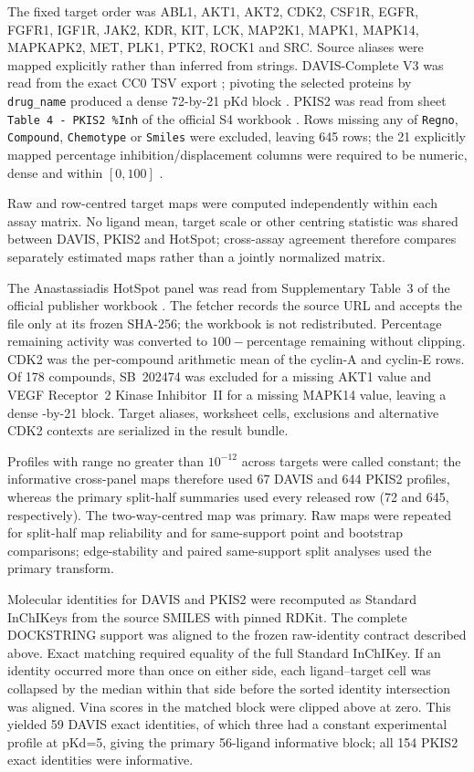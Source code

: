 The fixed target order was ABL1, AKT1, AKT2, CDK2, CSF1R, EGFR, FGFR1, IGF1R,
JAK2, KDR, KIT, LCK, MAP2K1, MAPK1, MAPK14, MAPKAPK2, MET, PLK1, PTK2, ROCK1
and SRC.  Source aliases were mapped explicitly rather than inferred from
strings.  DAVIS-Complete V3 was read from the exact CC0 TSV export
; pivoting the selected proteins by
\texttt{drug\_name} produced a dense 72-by-21 pKd block \cite{davis2011,wu2025davis}.
PKIS2 was read from sheet \texttt{Table 4 - PKIS2 \%Inh} of the official S4
workbook .  Rows missing any of \texttt{Regno},
\texttt{Compound}, \texttt{Chemotype} or \texttt{Smiles} were excluded, leaving
645 rows; the 21 explicitly mapped percentage inhibition/displacement columns
were required to be numeric, dense and within $[0,100]$ \cite{drewry2017}.

Raw and row-centred target maps were computed independently within each assay
matrix. No ligand mean, target scale or other centring statistic was shared
between DAVIS, PKIS2 and HotSpot; cross-assay agreement therefore compares
separately estimated maps rather than a jointly normalized matrix.

The Anastassiadis HotSpot panel was read from Supplementary Table~3 of the
official publisher workbook \cite{anastassiadis2011}. The fetcher records the
source URL and accepts the file only at its frozen SHA-256; the workbook is not
redistributed. Percentage remaining activity was converted to
$100-\text{percentage remaining}$ without clipping. CDK2 was the per-compound
arithmetic mean of the cyclin-A and cyclin-E rows. Of 178 compounds, SB~202474
was excluded for a missing AKT1 value and VEGF Receptor~2 Kinase Inhibitor~II
for a missing MAPK14 value, leaving a dense \HotspotLigands{}-by-21 block.
Target aliases, worksheet cells, exclusions and alternative CDK2 contexts are
serialized in the result bundle.

Profiles with range no greater than $10^{-12}$ across targets were called
constant; the informative cross-panel maps therefore used 67 DAVIS and 644
PKIS2 profiles, whereas the primary split-half summaries used every released
row (72 and 645, respectively).  The two-way-centred map was primary.  Raw maps
were repeated for split-half map reliability and for same-support point and
bootstrap comparisons; edge-stability and paired same-support split analyses
used the primary transform.

Molecular identities for DAVIS and PKIS2 were recomputed as Standard InChIKeys
from the source SMILES with pinned RDKit.  The complete DOCKSTRING support was
aligned to the frozen raw-identity contract described above.  Exact matching
required equality of the full Standard InChIKey.  If an identity occurred more
than once on either side, each ligand--target cell was collapsed by the median
within that side before the sorted identity intersection was aligned.  Vina
scores in the matched block were clipped above at zero.  This yielded 59 DAVIS
exact identities, of which three had a constant experimental profile at
pKd=5, giving the primary 56-ligand informative block; all 154 PKIS2 exact
identities were informative.

